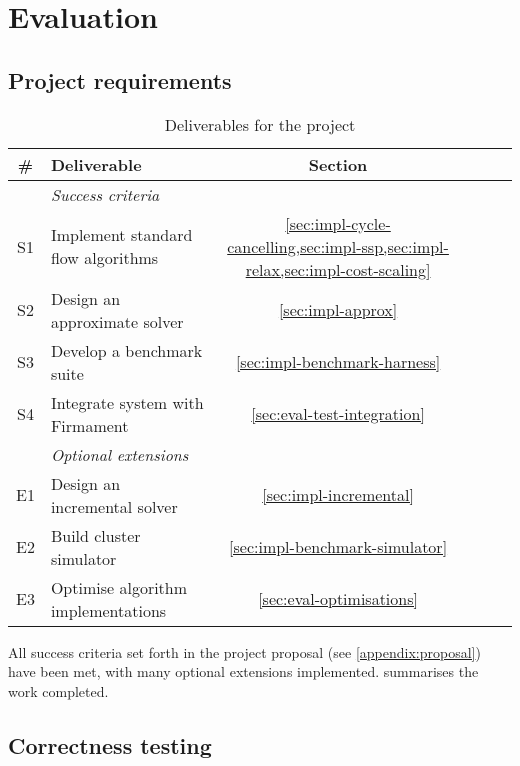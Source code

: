 \chapter{Evaluation} \label{chap:eval}


\section{Project requirements} 

\begin{table}
    \centering
    \begin{tabular}{clcccc}
        \textbf{\#} & \textbf{Deliverable} & \textbf{Section}
        \tabularnewline
        \hline
        & \textit{Success criteria} \tabularnewline
        S1 & Implement standard flow algorithms & \cref{sec:impl-cycle-cancelling,sec:impl-ssp,sec:impl-relax,sec:impl-cost-scaling} \tabularnewline
        S2 & Design an approximate solver & \cref{sec:impl-approx} \tabularnewline
        S3 & Develop a benchmark suite & \cref{sec:impl-benchmark-harness} \tabularnewline
        S4 & Integrate system with Firmament & \cref{sec:eval-test-integration} \tabularnewline
        \hline
        & \textit{Optional extensions} \tabularnewline
        E1 & Design an incremental solver & \cref{sec:impl-incremental} \tabularnewline
        E2 & Build cluster simulator & \cref{sec:impl-benchmark-simulator} \tabularnewline
        E3 & Optimise algorithm implementations & \cref{sec:eval-optimisations} \tabularnewline
        \hline
    \end{tabular}
    \crefsections
    \caption{Deliverables for the project}
    \label{table:eval-project-requirements}
\end{table}

All success criteria set forth in the project proposal (see \cref{appendix:proposal}) have been met, with many optional extensions implemented.  summarises the work completed.


\section{Correctness testing}


